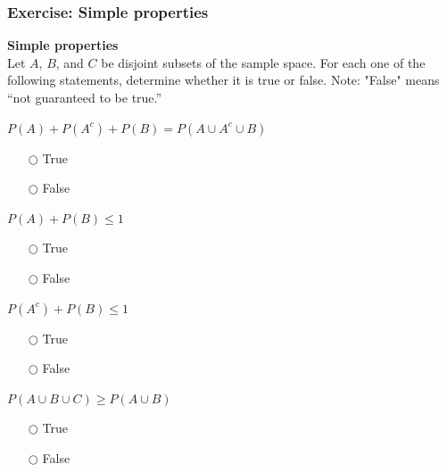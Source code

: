 \documentclass[pdftex, brazil, 12pt, twoside]{article}
\begin{document}
\begin{figure}[H]
  \begin{center}
  \end{center}
\end{figure}

\subsubsection{Exercise: Simple properties}
\label{un1-lec1-exec-simple-properties}

\begin{exercise}
  \textbf{Simple properties}\\
  Let $A$, $B$, and $C$ be disjoint subsets of the sample space. For each one of
  the following statements, determine whether it is true or false. Note: "False"
  means ``not guaranteed to be true.''

  $P(A) + P(A^c) + P(B) = P(A \cup A^c \cup B)$
  \begin{itemize}[noitemsep]
  \item[$\bigcirc$] True
  \item[$\bigcirc$] False
  \end{itemize}

  $P(A) + P(B) \le 1$
  \begin{itemize}[noitemsep]
  \item[$\bigcirc$] True
  \item[$\bigcirc$] False
  \end{itemize}

  $P(A^c) + P(B) \le 1$
  \begin{itemize}[noitemsep]
  \item[$\bigcirc$] True
  \item[$\bigcirc$] False
  \end{itemize}

  $P(A \cup B \cup C) \ge P(A \cup B)$
  \begin{itemize}[noitemsep]
  \item[$\bigcirc$] True
  \item[$\bigcirc$] False
  \end{itemize}
\end{exercise}
\end{document}

